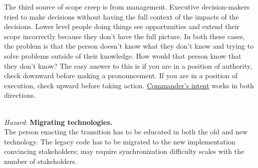 The third source of scope creep is from management. Executive decision-makers tried to make decisions without having the full context of the impacts of the decisions. Lower level people doing things see opportunities and extend their scope incorrectly because they don't have the full picture. In both these cases, the problem is that the person doesn't know what they don't know and trying to solve problems outside of their knowledge. How would that person know that they don't know? The easy answer to this is if you are in a position of authority, check downward before making a pronouncement. If you are in a position of execution, check upward before taking action. \href{https://en.wikipedia.org/wiki/Intent_(military)\%23Commander's_intent}{Commander's intent}
works in both directions.

\ \\
\textit{Hazard}: \textbf{Migrating technologies.} \\
The person enacting the transition has to be educated in both the old and new technology. 
The legacy code has to be migrated to the new implementation
convincing stakeholders; may require synchronization
difficulty scales with the number of stakeholders.